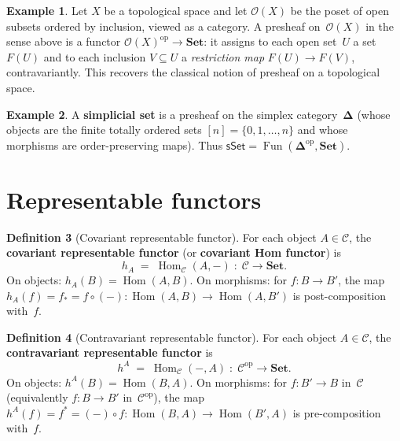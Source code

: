 \documentclass[a4paper,12pt]{book}
\DeclareMathOperator{\Hom}{Hom}
\DeclareMathOperator{\Fun}{Fun}
\newcommand{\Set}{\mathbf{Set}}
\newcommand{\op}{\mathrm{op}}
\theoremstyle{definition}
\newtheorem{definition}{Definition}[section]
\newtheorem{example}[definition]{Example}
\theoremstyle{plain}
\theoremstyle{remark}
\begin{document}
\begin{example}\label{ex:presheaf-topology}
Let $X$ be a topological space and let $\mathcal{O}(X)$ be the poset of
open subsets ordered by inclusion, viewed as a category.
A presheaf on~$\mathcal{O}(X)$ in the sense above is a functor
$\mathcal{O}(X)^{\op}\to\Set$: it assigns to each open set~$U$ a
set~$F(U)$ and to each inclusion $V\subseteq U$ a \emph{restriction map}
$F(U)\to F(V)$, contravariantly.  This recovers the classical notion of
presheaf on a topological space.
\end{example}

\begin{example}\label{ex:presheaf-simplicial}
\index{$\mathbf{\Delta}$}
A \textbf{simplicial set} is a presheaf on the simplex category~$\mathbf{\Delta}$
(whose objects are the finite totally ordered sets $[n]=\{0,1,\ldots,n\}$
and whose morphisms are order-preserving maps).  Thus
$\mathsf{sSet} = \Fun(\mathbf{\Delta}^{\op},\Set)$.
\end{example}


\section{Representable functors}\label{sec:representable}

\begin{definition}[Covariant representable functor]\label{def:h-lower}
For each object $A\in\mathcal{C}$, the \textbf{covariant representable
functor} (or \textbf{covariant Hom functor}) is
\[
    h_A \;=\; \Hom_{\mathcal{C}}(A,-) \;\colon\;
    \mathcal{C} \longrightarrow \Set.
\]
On objects: $h_A(B) = \Hom(A,B)$.
On morphisms: for $f\colon B\to B'$, the map
$h_A(f) = f_* = f\circ(-)\colon \Hom(A,B)\to\Hom(A,B')$
is post-composition with~$f$.
\end{definition}

\begin{definition}[Contravariant representable functor]\label{def:h-upper}
For each object $A\in\mathcal{C}$, the \textbf{contravariant representable
functor} is
\[
    h^A \;=\; \Hom_{\mathcal{C}}(-,A) \;\colon\;
    \mathcal{C}^{\op} \longrightarrow \Set.
\]
On objects: $h^A(B) = \Hom(B,A)$.
On morphisms: for $f\colon B'\to B$ in~$\mathcal{C}$ (equivalently
$f\colon B\to B'$ in~$\mathcal{C}^{\op}$), the map
$h^A(f) = f^* = (-)\circ f\colon \Hom(B,A)\to\Hom(B',A)$
is pre-composition with~$f$.
\end{definition}
\end{document}

